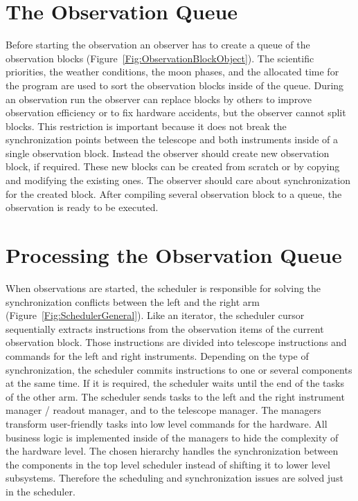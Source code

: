 \section{The Observation Queue}

Before starting the observation an observer has to create a queue of the observation blocks (Figure~\ref{Fig:ObservationBlockObject}). The scientific priorities, the weather conditions, the moon phases, and the allocated time for the program are used to sort the observation blocks inside of the queue. During an observation run the observer can replace blocks by others to improve observation efficiency or to fix hardware accidents, but the observer cannot split blocks. This restriction is important because it does not break the synchronization points between the telescope and both instruments inside of a single observation block. Instead the observer should create new observation block, if required. These new blocks can be created from scratch or by copying and modifying the existing ones. The observer should care about synchronization for the created block. After compiling several observation block to a queue, the observation is ready to be executed. 

\section{Processing the Observation Queue}

When observations are started, the scheduler is responsible for solving the synchronization conflicts between the left and the right arm (Figure~\ref{Fig:SchedulerGeneral}). Like an iterator, the scheduler cursor sequentially extracts instructions from the observation items of the current observation block. Those instructions are divided into telescope instructions and commands for the left and right instruments. Depending on the type of synchronization, the scheduler commits instructions to one or several components at the same time. If it is required, the scheduler waits until the end of the tasks of the other arm.  The scheduler sends tasks to the left and the right instrument manager / readout manager, and to the telescope manager. The managers transform user-friendly tasks into low level commands for the hardware. All business logic is implemented inside of the managers to hide the complexity of the hardware level. The chosen hierarchy handles the synchronization between the components in the top level scheduler instead of shifting it to lower level subsystems. Therefore the scheduling and synchronization issues are solved just in the scheduler. 

